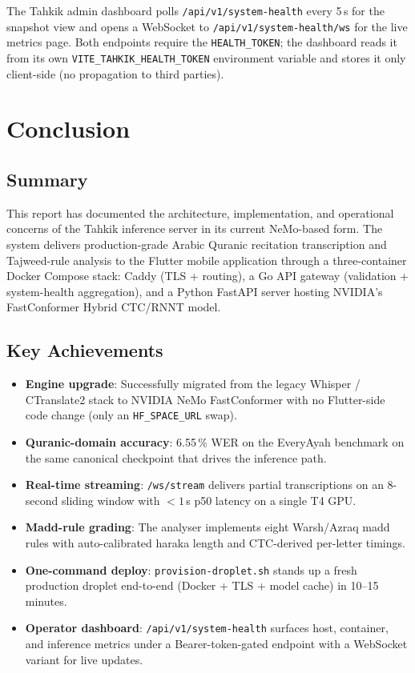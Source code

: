 The Tahkik admin dashboard polls \texttt{/api/v1/system-health} every 5\,s for the snapshot view and opens a WebSocket to \texttt{/api/v1/system-health/ws} for the live metrics page. Both endpoints require the \texttt{HEALTH\_TOKEN}; the dashboard reads it from its own \texttt{VITE\_TAHKIK\_HEALTH\_TOKEN} environment variable and stores it only client-side (no propagation to third parties).

\chapter{Conclusion}

\section{Summary}

This report has documented the architecture, implementation, and operational concerns of the Tahkik inference server in its current NeMo-based form. The system delivers production-grade Arabic Quranic recitation transcription and Tajweed-rule analysis to the Flutter mobile application through a three-container Docker Compose stack: Caddy (TLS + routing), a Go API gateway (validation + system-health aggregation), and a Python FastAPI server hosting NVIDIA's FastConformer Hybrid CTC/RNNT model.

\section{Key Achievements}

\begin{infobox}[title=Project Highlights]
\begin{itemize}
  \item \textbf{Engine upgrade}: Successfully migrated from the legacy Whisper / CTranslate2 stack to NVIDIA NeMo FastConformer with no Flutter-side code change (only an \texttt{HF\_SPACE\_URL} swap).
  \item \textbf{Quranic-domain accuracy}: 6.55\,\% WER on the EveryAyah benchmark on the same canonical checkpoint that drives the inference path.
  \item \textbf{Real-time streaming}: \texttt{/ws/stream} delivers partial transcriptions on an 8-second sliding window with ${<}1$\,s p50 latency on a single T4 GPU.
  \item \textbf{Madd-rule grading}: The analyser implements eight Warsh/Azraq madd rules with auto-calibrated haraka length and CTC-derived per-letter timings.
  \item \textbf{One-command deploy}: \texttt{provision-droplet.sh} stands up a fresh production droplet end-to-end (Docker + TLS + model cache) in 10--15 minutes.
  \item \textbf{Operator dashboard}: \texttt{/api/v1/system-health} surfaces host, container, and inference metrics under a Bearer-token-gated endpoint with a WebSocket variant for live updates.
\end{itemize}
\end{infobox}

